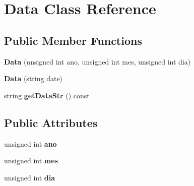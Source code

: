 \hypertarget{class_data}{\section{Data Class Reference}
\label{class_data}
}
\subsection*{Public Member Functions}
\begin{DoxyCompactItemize}
\item 
\hypertarget{class_data_a2d45e272eb3ff0783c1603ddf7a44569}{{\bfseries Data} (unsigned int ano, unsigned int mes, unsigned int dia)}\label{class_data_a2d45e272eb3ff0783c1603ddf7a44569}

\item 
\hypertarget{class_data_add8227267c76e3fecb385d7cd7fbcf4b}{{\bfseries Data} (string date)}\label{class_data_add8227267c76e3fecb385d7cd7fbcf4b}

\item 
\hypertarget{class_data_a2a9f0b2202a6bf68215d3e06dc3cb57e}{string {\bfseries get\+Data\+Str} () const }\label{class_data_a2a9f0b2202a6bf68215d3e06dc3cb57e}

\end{DoxyCompactItemize}
\subsection*{Public Attributes}
\begin{DoxyCompactItemize}
\item 
\hypertarget{class_data_a1811fab972bdf6ed644c4eb7412bd043}{unsigned int {\bfseries ano}}\label{class_data_a1811fab972bdf6ed644c4eb7412bd043}

\item 
\hypertarget{class_data_a586deb479ec2031a0d3ceec8280f7706}{unsigned int {\bfseries mes}}\label{class_data_a586deb479ec2031a0d3ceec8280f7706}

\item 
\hypertarget{class_data_a71a904380d17858da0b902e9a2563546}{unsigned int {\bfseries dia}}\label{class_data_a71a904380d17858da0b902e9a2563546}

\end{DoxyCompactItemize}
